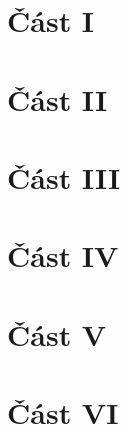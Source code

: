 \documentclass[open=any, titlepage=false, chapterprefix=true]{scrbook}
\begin{document}
\tableofcontents
	\part{Část I}
	\part{Část II}
	\part{Část III}
	\part{Část IV}
	\part{Část V}
	\part{Část VI}
\end{document}
